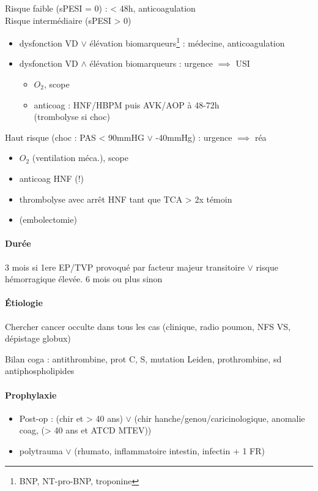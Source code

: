\documentclass{article}
\begin{document}
Risque faible (sPESI = 0) : \faHospitalO{} < 48h, anticoagulation\\
Risque intermédiaire (sPESI > 0)
\begin{itemize}
\item dysfonction VD $\vee$ élévation biomarqueurs\footnote{BNP, NT-pro-BNP,
    troponine} : \faHospitalO{}
  médecine, anticoagulation
\item dysfonction VD $\wedge$ élévation biomarqueurs : urgence \danger{}
  $\implies$ USI
  \begin{itemize}
  \item $O_2$, scope
  \item anticoag : HNF/HBPM puis AVK/AOP à 48-72h\\
  (trombolyse si choc)
    \end{itemize}

\end{itemize}
Haut risque (choc : PAS < 90mmHG $\vee$ -40mmHg) : urgence \skull $\implies$ réa
\begin{itemize}
\item $O_2$ (ventilation méca.), scope
\item anticoag HNF (!)
\item thrombolyse avec arrêt HNF tant que TCA > 2x témoin
\item (embolectomie)
\end{itemize}

\paragraph{Durée}
3 mois si 1ere EP/TVP provoqué par facteur majeur transitoire $\vee$ risque
hémorragique élevée. 6 mois ou plus sinon

\paragraph{Étiologie}
Chercher cancer occulte dans tous les cas (clinique, radio poumon, NFS VS,
dépistage globux)

Bilan coga : {antithrombine, prot C, S}, mutation {Leiden, prothrombine}, sd
antiphospholipides

\paragraph{Prophylaxie}
\begin{itemize}
\item Post-op : (chir et > 40 ans) $\vee$ (chir hanche/genou/caricinologique, anomalie
  coag, (> 40 ans et ATCD MTEV))
\item polytrauma $\vee$ ({rhumato, inflammatoire intestin, infectin} + 1 FR)

\end{itemize}
\end{document}
